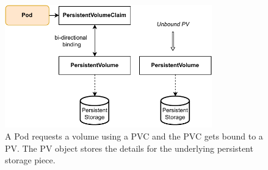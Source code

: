 \begin{figure}[ht]
	\centering
	\includegraphics[width=0.8\textwidth]{resources/pvc-pv-binding.pdf}
	\caption{A Pod requests a volume using a PVC and the PVC gets bound to a PV. The PV object stores the details for the underlying persistent storage piece.}
	\label{figure:pvc-pv}
\end{figure}

